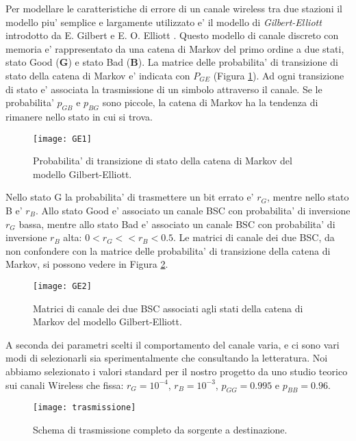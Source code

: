 \documentclass[a4paper,11pt]{article}
\theoremstyle{definition}
\begin{document}
Per modellare le caratteristiche di errore di un canale wireless tra due stazioni il modello piu' semplice e largamente utilizzato e' il modello di \textit{Gilbert-Elliott} introdotto da E. Gilbert \cite{gilbert} e E. O. Elliott \cite{elliott}. Questo modello di canale discreto con memoria e' rappresentato da una catena di Markov del primo ordine a due stati, stato Good (\textbf{G}) e stato Bad (\textbf{B}). La matrice delle probabilita' di transizione di stato della catena di Markov e' indicata con $P_{GE}$ (Figura \ref{fig:ge1}). Ad ogni transizione di stato e' associata la trasmissione di un simbolo attraverso il canale. Se le probabilita' $p_{GB}$ e $p_{BG}$ sono piccole, la catena di Markov ha la tendenza di rimanere nello stato in cui si trova.

\begin{figure}
	\centering
	\texttt{[image: GE1]}
	\caption{Probabilita' di transizione di stato della catena di Markov del modello Gilbert-Elliott. }
	\label{fig:ge1}
\end{figure}

Nello stato G la probabilita' di trasmettere un bit errato e' $r_G$, mentre nello stato B e' $r_B$. Allo stato Good e' associato un canale BSC con probabilita' di inversione $r_G$ bassa, mentre allo stato Bad e' associato un canale BSC con probabilita' di inversione $r_B$ alta: $0<r_G<<r_B<0.5$.
Le matrici di canale dei due BSC, da non confondere con la matrice delle probabilita' di transizione della catena di Markov, si possono vedere in Figura \ref{fig:ge2}.

\begin{figure}
	\centering
	\texttt{[image: GE2]}
	\caption{Matrici di canale dei due BSC associati agli stati della catena di Markov del modello Gilbert-Elliott. }
	\label{fig:ge2}
\end{figure}

A seconda dei parametri scelti il comportamento del canale varia, e ci sono vari modi di selezionarli sia sperimentalmente che consultando la letteratura. Noi abbiamo selezionato i valori standard per il nostro progetto da uno studio teorico sui canali Wireless \cite{GE} che fissa: $r_G=10^{-4}$, $r_B=10^{-3}$, $p_{GG}=0.995$ e $p_{BB}=0.96$. 

\clearpage

\begin{figure}
	\centering
	\texttt{[image: trasmissione]}
	\caption{Schema di trasmissione completo da sorgente a destinazione. }
	\label{fig:tras}
\end{figure}
\end{document}
